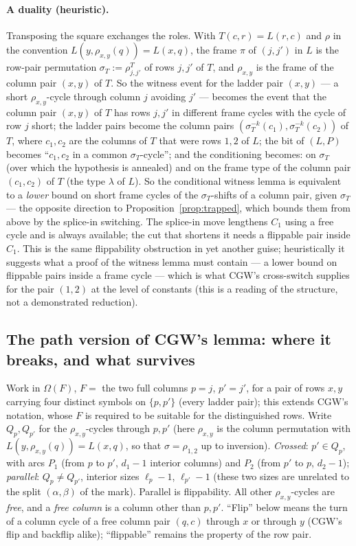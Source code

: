 \paragraph{A duality (heuristic).}  Transposing the square exchanges
the roles.  With $T(c,r)=L(r,c)$ and $\rho$ in the convention
$L(y,\rho_{x,y}(q))=L(x,q)$, the frame $\pi$ of $(j,j')$ in $L$ is the
row-pair permutation $\sigma_T:=\rho^T_{j,j'}$ of rows $j,j'$ of $T$, and
$\rho_{x,y}$ is the frame of the column pair $(x,y)$ of $T$.  So the
witness event for the ladder pair $(x,y)$ --- a short
$\rho_{x,y}$-cycle through column $j$ avoiding $j'$ --- becomes the
event that the column pair $(x,y)$ of $T$ has rows $j,j'$ in different
frame cycles with the cycle of row $j$ short; the ladder pairs become
the column pairs $(\sigma_T^{-k}(c_1),\sigma_T^{-k}(c_2))$ of $T$, where
$c_1,c_2$ are the columns of $T$ that were rows $1,2$ of $L$; the bit
of $(L,P)$ becomes ``$c_1,c_2$ in a common $\sigma_T$-cycle''; and the
conditioning becomes: on $\sigma_T$ (over which the hypothesis is
annealed) and on the frame type of the column pair $(c_1,c_2)$ of $T$
(the type $\lambda$ of $L$).  So the conditional witness lemma is
equivalent to a \emph{lower} bound on short frame cycles of the
$\sigma_T$-shifts of a column pair, given $\sigma_T$ --- the opposite
direction to Proposition~\ref{prop:trapped}, which bounds them from
above by the splice-in switching.  The splice-in move
lengthens $C_1$ using a free cycle and is always available; the cut
that shortens it needs a flippable pair inside $C_1$.  This is the
same flippability obstruction in yet another guise; heuristically it
suggests what a proof of the witness lemma must contain --- a lower
bound on flippable pairs inside a frame cycle --- which is what CGW's
cross-switch supplies for the pair $(1,2)$ at the level of constants
(this is a reading of the structure, not a demonstrated reduction).

\subsection{The path version of CGW's lemma: where it breaks, and what survives}
\label{sec:crossspace}

Work in $\Omega(F)$, $F=$ the two full columns $p=j$, $p'=j'$, for a
pair of rows $x,y$ carrying four distinct symbols on $\{p,p'\}$ (every
ladder pair); this extends CGW's notation, whose $F$ is required to be
suitable for the distinguished rows.  Write $Q_p,Q_{p'}$ for the
$\rho_{x,y}$-cycles through $p,p'$ (here $\rho_{x,y}$ is the column
permutation with $L(y,\rho_{x,y}(q))=L(x,q)$, so that
$\sigma=\rho_{1,2}$ up to inversion).  \emph{Crossed}: $p'\in Q_p$,
with arcs $P_1$ (from $p$ to $p'$, $d_1-1$ interior columns) and $P_2$
(from $p'$ to $p$, $d_2-1$); \emph{parallel}: $Q_p\ne Q_{p'}$, interior
sizes $\ell_p-1$, $\ell_{p'}-1$ (these two sizes are unrelated to the
split $(\alpha,\beta)$ of the mark).  Parallel is flippability.  All
other $\rho_{x,y}$-cycles are \emph{free}, and a \emph{free column} is
a column other than $p,p'$.  ``Flip'' below means the turn of a column
cycle of a free column pair $(q,c)$ through $x$ or through $y$ (CGW's
flip and backflip alike); ``flippable'' remains the property of the
row pair.

